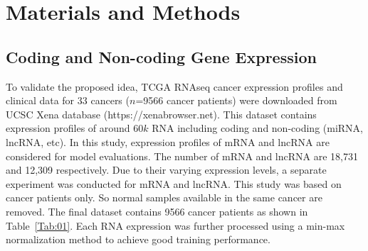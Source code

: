 \documentclass{bioinfo}
\begin{document}
\section{Materials and Methods}
\subsection{Coding and Non-coding Gene Expression}
To validate the proposed idea, TCGA RNAseq cancer expression profiles and clinical data for $33$ cancers ($n$=9566 cancer patients) were downloaded from UCSC Xena database (https://xenabrowser.net). 
This dataset contains expression profiles of around $60k$ RNA including coding and non-coding (miRNA, lncRNA, etc). In this study, expression profiles of mRNA and lncRNA are considered for model evaluations. The number of mRNA and lncRNA are 18,731 and 12,309 respectively. Due to their varying expression levels, a separate experiment was conducted for mRNA and lncRNA. This study was based on cancer patients only. So normal samples available in the same cancer are removed. The final dataset contains 9566 cancer patients as shown in Table~\ref{Tab:01}. Each RNA expression was further processed using a min-max normalization method to achieve good training performance. 
\end{document}
